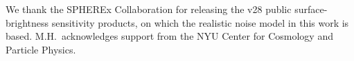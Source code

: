 \documentclass[twocolumn,prd,nofootinbib,superscriptaddress,floatfix,11pt]{revtex4-2}
\begin{document}
\begin{acknowledgments}
We thank the SPHEREx Collaboration for releasing the v28 public surface-brightness sensitivity products, on which the realistic noise model in this work is based.  M.H.\ acknowledges support from the NYU Center for Cosmology and Particle Physics.
\end{acknowledgments}



\end{document}
